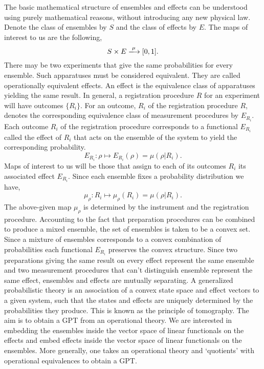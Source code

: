 \documentclass[11pt]{report}
\begin{document}
	The basic mathematical structure of ensembles and effects can be understood using purely mathematical reasons, without introducing any new physical law. Denote the class of ensembles by ${S}$ and the class of effects by ${E}$. The maps of interest to us are the following,
	$${S}\times {E}\xlongrightarrow{\mu}[0,1].$$
	There may be two experiments that give the same probabilities for every ensemble. Such apparatuses must be considered equivalent. They are called operationally equivalent effects. An effect is the equivalence class of apparatuses yielding the same result. In general, a registration procedure $R$ for an experiment will have outcomes $\{R_i\}$. For an outcome, $R_i$ of the registration procedure $R$, denotes the corresponding equivalence class of measurement procedures by $E_{R_i}$. Each outcome $R_i$ of the registration procedure corresponds to a functional $E_{R_i}$ called the effect of $R_i$ that acts on the ensemble of the system to yield the corresponding probability.
	$$E_{R_i}:\rho\mapsto E_{R_i}(\rho)=\mu(\rho|R_i).$$
	Maps of interest to us will be those that assign to each of its outcomes $R_i$ its associated effect $E_{R_i}$. Since each ensemble fixes a probability distribution we have,
	$$\mu_\rho:R_i\mapsto \mu_\rho(R_i)=\mu(\rho|R_i).$$
	The above-given map $\mu_\rho$ is determined by the instrument and the registration procedure. Accounting to the fact that preparation procedures can be combined to produce a mixed ensemble, the set of ensembles is taken to be a convex set. Since a mixture of ensembles corresponds to a convex combination of probabilities each functional $E_{R_i}$ preserves the convex structure. Since two preparations giving the same result on every effect represent the same ensemble and two measurement procedures that can't distinguish ensemble represent the same effect, ensembles and effects are mutually separating. A generalized probabilistic theory is an association of a convex state space and effect vectors to a given system, such that the states and effects are uniquely determined by the probabilities they produce. This is known as the principle of tomography. The aim is to obtain a GPT from an operational theory. We are interested in embedding the ensembles inside the vector space of linear functionals on the effects and embed effects inside the vector space of linear functionals on the ensembles. More generally, one takes an operational theory and `quotients' with operational equivalences to obtain a GPT.
	
\end{document}
